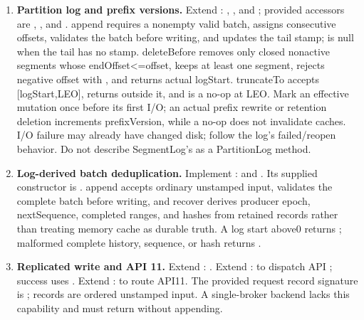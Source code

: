\begin{enumerate}
\item \textbf{Partition log and prefix versions.} Extend : , , and ; provided accessors are , , and . append requires a nonempty valid batch, assigns consecutive offsets, validates the batch before writing, and updates the tail stamp;  is null when the tail has no stamp. deleteBefore removes only closed nonactive segments whose endOffset<=offset, keeps at least one segment, rejects negative offset with , and returns actual logStart. truncateTo accepts [logStart,LEO], returns  outside it, and is a no-op at LEO. Mark an effective mutation once before its first I/O; an actual prefix rewrite or retention deletion increments prefixVersion, while a no-op does not invalidate caches. I/O failure may already have changed disk; follow the log's failed/reopen behavior. Do not describe SegmentLog's  as a PartitionLog method.
\item \textbf{Log-derived batch deduplication.} Implement :  and . Its supplied constructor is . append accepts ordinary unstamped input, validates the complete batch before writing, and recover derives producer epoch, nextSequence, completed ranges, and hashes from retained records rather than treating memory cache as durable truth. A log start above0 returns ; malformed complete history, sequence, or hash returns .
\item \textbf{Replicated write and API 11.} Extend : . Extend :  to dispatch API ; success uses . Extend :  to route API11. The provided request record signature is ; records are ordered unstamped input. A single-broker backend lacks this capability and must return  without appending.

\end{enumerate}
